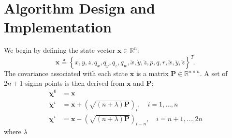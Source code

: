 \chapter{Algorithm Design and Implementation}

We begin by defining the state vector $\mathbf{x} \in \mathbb{R}^{n}$:
%
\begin{equation}
\mathbf{x} \triangleq \left\lbrace
x,
y,
z,
q_{x},
q_{y},
q_{z},
q_{w},
\dot{x},
\dot{y},
\dot{z},
p,
q,
r,
\ddot{x},
\ddot{y},
\ddot{z}
\right\rbrace ^{T}.
\end{equation}
%
The covariance associated with each state $\mathbf{x}$ is a matrix $\mathbf{P} \in \mathbb{R}^{n \times n}$. A set of $2n + 1$ sigma points is then derived from $\mathbf{x}$ and $\mathbf{P}$:
%
\begin{align}
\mathbf{\chi}^{0} &= \mathbf{x} \nonumber\\
\mathbf{\chi}^{i} &= \mathbf{x} + \left( \sqrt{\left( n + \lambda \right) \mathbf{P} } \right)_{i}, \quad i = 1, \dots, n \\
\mathbf{\chi}^{i} &= \mathbf{x} - \left( \sqrt{\left( n + \lambda \right) \mathbf{P} } \right)_{i-n}, \quad i = n+1, \dots, 2n \nonumber
\end{align}
%
where $\lambda$